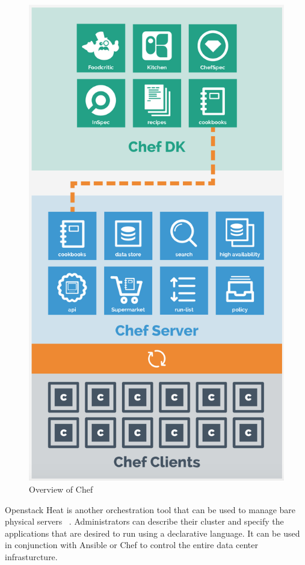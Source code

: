 \documentclass[10pt,twocolumn]{article}
\begin{document}
\begin{figure}[thpb]
  \centering
  	\includegraphics[width=\columnwidth]{chef}
    \caption{Overview of Chef ~\cite{chef_overview}}
	\label{fig:chef}
\end{figure}

Openstack Heat is another orchestration tool that can be used to manage bare physical servers ~\cite{openstack}.
Administrators can describe their cluster and specify the applications that are desired to run using a declarative language.
It can be used in conjunction with Ansible or Chef to control the entire data center infrasturcture.
\end{document}

